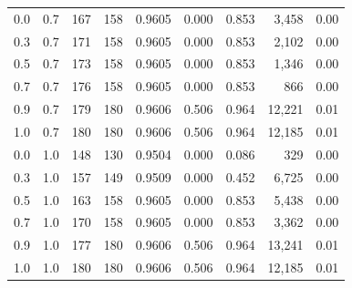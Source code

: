 \begin{table}[!htbp]
\begin{tabular}{ccrrrrrrr}
\hline
0.0 & 0.7 & 167 & 158 & 0.9605 & 0.000 & 0.853 & 3,458 & 0.00 \\
0.3 & 0.7 & 171 & 158 & 0.9605 & 0.000 & 0.853 & 2,102 & 0.00 \\
0.5 & 0.7 & 173 & 158 & 0.9605 & 0.000 & 0.853 & 1,346 & 0.00 \\
0.7 & 0.7 & 176 & 158 & 0.9605 & 0.000 & 0.853 & 866 & 0.00 \\
0.9 & 0.7 & 179 & 180 & 0.9606 & 0.506 & 0.964 & 12,221 & 0.01 \\
1.0 & 0.7 & 180 & 180 & 0.9606 & 0.506 & 0.964 & 12,185 & 0.01 \\
\hline
0.0 & 1.0 & 148 & 130 & 0.9504 & 0.000 & 0.086 & 329 & 0.00 \\
0.3 & 1.0 & 157 & 149 & 0.9509 & 0.000 & 0.452 & 6,725 & 0.00 \\
0.5 & 1.0 & 163 & 158 & 0.9605 & 0.000 & 0.853 & 5,438 & 0.00 \\
0.7 & 1.0 & 170 & 158 & 0.9605 & 0.000 & 0.853 & 3,362 & 0.00 \\
0.9 & 1.0 & 177 & 180 & 0.9606 & 0.506 & 0.964 & 13,241 & 0.01 \\
1.0 & 1.0 & 180 & 180 & 0.9606 & 0.506 & 0.964 & 12,185 & 0.01 \\
\hline
\end{tabular}
\end{table}
